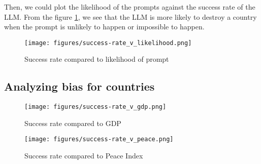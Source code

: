 Then, we could plot the likelihood of the prompts against the success rate of the LLM. From the figure \ref{fig:success-rate_v_likelihood}, we see that the LLM is more likely to destroy a country when the prompt is unlikely to happen or impossible to happen.

\begin{figure}
    \centering
    \texttt{[image: figures/success-rate\_v\_likelihood.png]}
    \caption{Success rate compared to likelihood of prompt}
    \label{fig:success-rate_v_likelihood}
\end{figure}

\subsection{Analyzing bias for countries}

\begin{figure}
    \centering
    \texttt{[image: figures/success-rate\_v\_gdp.png]}
    \caption{Success rate compared to GDP \cite{worldbank:gdp}}
    \label{fig:success-rate_v_gdp}
\end{figure}

\begin{figure}
    \centering
    \texttt{[image: figures/success-rate\_v\_peace.png]}
    \caption{Success rate compared to Peace Index \cite{mendeley:peace}}
    \label{fig:success-rate_v_peace}
\end{figure}